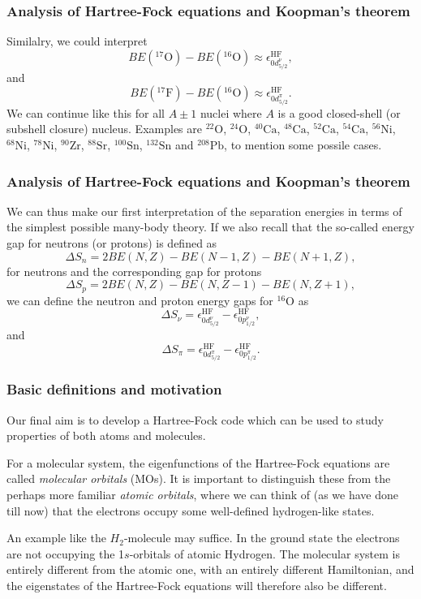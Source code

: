 \documentclass{beamer}
\begin{document}
\begin{frame}
\frametitle{Analysis of Hartree-Fock equations and Koopman's theorem}

\begin{block}{}
Similalry, we could interpret
\[
BE(^{17}\mathrm{O})-BE(^{16}\mathrm{O})\approx \epsilon_{0d^{\nu}_{5/2}}^{\mathrm{HF}}, 
\]
and 
\[
BE(^{17}\mathrm{F})-BE(^{16}\mathrm{O})\approx\epsilon_{0d^{\pi}_{5/2}}^{\mathrm{HF}}.
\]
We can continue like this for all $A\pm 1$ nuclei where $A$ is a good closed-shell (or subshell closure)
nucleus. Examples are ${}^{22}\mbox{O}$, ${}^{24}\mbox{O}$, ${}^{40}\mbox{Ca}$, ${}^{48}\mbox{Ca}$, ${}^{52}\mbox{Ca}$, ${}^{54}\mbox{Ca}$, ${}^{56}\mbox{Ni}$, 
${}^{68}\mbox{Ni}$, ${}^{78}\mbox{Ni}$, ${}^{90}\mbox{Zr}$, ${}^{88}\mbox{Sr}$, ${}^{100}\mbox{Sn}$, ${}^{132}\mbox{Sn}$ and ${}^{208}\mbox{Pb}$, to mention some possile cases.
\end{block}
\end{frame}

\begin{frame}
\frametitle{Analysis of Hartree-Fock equations and Koopman's theorem}

\begin{block}{}
We can thus make our first interpretation of the separation energies in terms of the simplest
possible many-body theory. 
If we also recall that the so-called energy gap for neutrons (or protons) is defined as
\[
\Delta S_n= 2BE(N,Z)-BE(N-1,Z)-BE(N+1,Z),
\]
for neutrons and the corresponding gap for protons
\[
\Delta S_p= 2BE(N,Z)-BE(N,Z-1)-BE(N,Z+1),
\]
we can define the neutron and proton energy gaps for ${}^{16}\mbox{O}$ as
\[
\Delta S_{\nu}=\epsilon_{0d^{\nu}_{5/2}}^{\mathrm{HF}}-\epsilon_{0p^{\nu}_{1/2}}^{\mathrm{HF}}, 
\]
and 
\[
\Delta S_{\pi}=\epsilon_{0d^{\pi}_{5/2}}^{\mathrm{HF}}-\epsilon_{0p^{\pi}_{1/2}}^{\mathrm{HF}}. 
\]
\end{block}
\end{frame}

\begin{frame}
\frametitle{Basic definitions and motivation}

\begin{block}{}

Our final aim is to develop a Hartree-Fock code which can be used to study properties of
both atoms and molecules.

For a molecular system, the eigenfunctions of the Hartree-Fock equations are called
\emph{molecular orbitals} (MOs). It is important to distinguish these
from the perhaps more familiar \emph{atomic orbitals}, where we can think of (as we have done till now)
that the electrons occupy some well-defined hydrogen-like states.

An example like the $H_2$-molecule may suffice.
In the ground state the electrons are not occupying the 1$s$-orbitals of atomic Hydrogen. The
molecular system is entirely different from the atomic one, with an entirely different Hamiltonian,
and the eigenstates of the Hartree-Fock equations will therefore also be different.
\end{block}
\end{frame}
\end{document}
